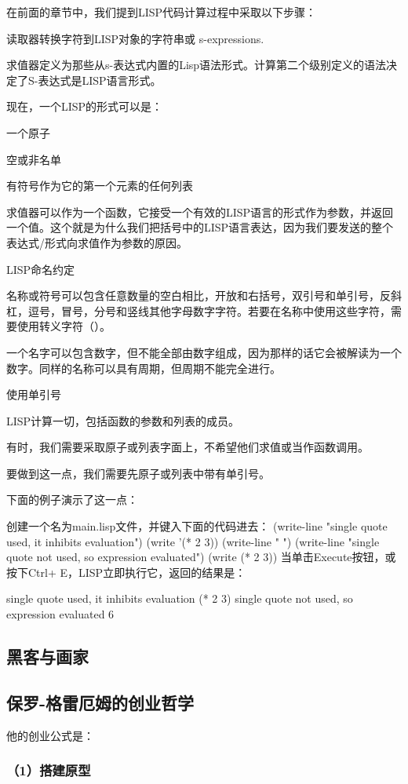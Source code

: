 \documentclass[11pt]{ctexart}
\begin{document}
{{{{在前面的章节中，我们提到LISP代码计算过程中采取以下步骤：

读取器转换字符到LISP对象的字符串或 s-expressions.

求值器定义为那些从s-表达式内置的Lisp语法形式。计算第二个级别定义的语法决定了S-表达式是LISP语言形式。

现在，一个LISP的形式可以是：

一个原子

空或非名单

有符号作为它的第一个元素的任何列表

求值器可以作为一个函数，它接受一个有效的LISP语言的形式作为参数，并返回一个值。这个就是为什么我们把括号中的LISP语言表达，因为我们要发送的整个表达式/形式向求值作为参数的原因。

LISP命名约定

名称或符号可以包含任意数量的空白相比，开放和右括号，双引号和单引号，反斜杠，逗号，冒号，分号和竖线其他字母数字字符。若要在名称中使用这些字符，需要使用转义字符（）。

一个名字可以包含数字，但不能全部由数字组成，因为那样的话它会被解读为一个数字。同样的名称可以具有周期，但周期不能完全进行。

使用单引号

LISP计算一切，包括函数的参数和列表的成员。

有时，我们需要采取原子或列表字面上，不希望他们求值或当作函数调用。

要做到这一点，我们需要先原子或列表中带有单引号。

下面的例子演示了这一点：

创建一个名为main.lisp文件，并键入下面的代码进去：
(write-line "single quote used, it inhibits evaluation")
(write '(* 2 3))
(write-line " ")
(write-line "single quote not used, so expression evaluated")
(write (* 2 3))
当单击Execute按钮，或按下Ctrl+ E，LISP立即执行它，返回的结果是：

single quote used, it inhibits evaluation
(* 2 3)
single quote not used, so expression evaluated
6

\subsection{黑客与画家}
\label{sec:org270665d}
\subsection{保罗-格雷厄姆的创业哲学}
\label{sec:org2307260}
他的创业公式是：

\subsubsection{（1）搭建原型}
\label{sec:orga6ce0c7}
}}}}
\end{document}
